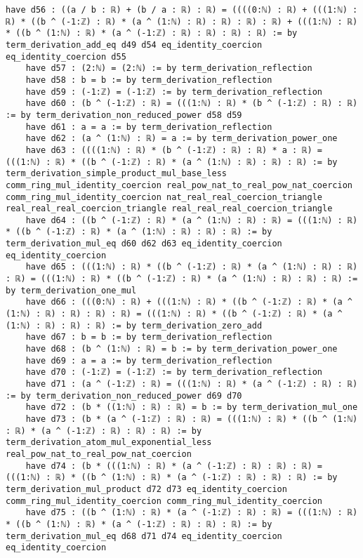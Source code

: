\documentclass{article}
\begin{document}
\begin{tcolorbox}[colback=white!10, width=\linewidth]
\begin{lstlisting}[language=Lean4]
    have d56 : ((a / b : ℝ) + (b / a : ℝ) : ℝ) = ((((0:ℕ) : ℝ) + (((1:ℕ) : ℝ) * ((b ^ (-1:ℤ) : ℝ) * (a ^ (1:ℕ) : ℝ) : ℝ) : ℝ) : ℝ) + (((1:ℕ) : ℝ) * ((b ^ (1:ℕ) : ℝ) * (a ^ (-1:ℤ) : ℝ) : ℝ) : ℝ) : ℝ) := by term_derivation_add_eq d49 d54 eq_identity_coercion eq_identity_coercion d55
    have d57 : (2:ℕ) = (2:ℕ) := by term_derivation_reflection
    have d58 : b = b := by term_derivation_reflection
    have d59 : (-1:ℤ) = (-1:ℤ) := by term_derivation_reflection
    have d60 : (b ^ (-1:ℤ) : ℝ) = (((1:ℕ) : ℝ) * (b ^ (-1:ℤ) : ℝ) : ℝ) := by term_derivation_non_reduced_power d58 d59
    have d61 : a = a := by term_derivation_reflection
    have d62 : (a ^ (1:ℕ) : ℝ) = a := by term_derivation_power_one
    have d63 : ((((1:ℕ) : ℝ) * (b ^ (-1:ℤ) : ℝ) : ℝ) * a : ℝ) = (((1:ℕ) : ℝ) * ((b ^ (-1:ℤ) : ℝ) * (a ^ (1:ℕ) : ℝ) : ℝ) : ℝ) := by term_derivation_simple_product_mul_base_less comm_ring_mul_identity_coercion real_pow_nat_to_real_pow_nat_coercion comm_ring_mul_identity_coercion nat_real_real_coercion_triangle real_real_real_coercion_triangle real_real_real_coercion_triangle
    have d64 : ((b ^ (-1:ℤ) : ℝ) * (a ^ (1:ℕ) : ℝ) : ℝ) = (((1:ℕ) : ℝ) * ((b ^ (-1:ℤ) : ℝ) * (a ^ (1:ℕ) : ℝ) : ℝ) : ℝ) := by term_derivation_mul_eq d60 d62 d63 eq_identity_coercion eq_identity_coercion
    have d65 : (((1:ℕ) : ℝ) * ((b ^ (-1:ℤ) : ℝ) * (a ^ (1:ℕ) : ℝ) : ℝ) : ℝ) = (((1:ℕ) : ℝ) * ((b ^ (-1:ℤ) : ℝ) * (a ^ (1:ℕ) : ℝ) : ℝ) : ℝ) := by term_derivation_one_mul
    have d66 : (((0:ℕ) : ℝ) + (((1:ℕ) : ℝ) * ((b ^ (-1:ℤ) : ℝ) * (a ^ (1:ℕ) : ℝ) : ℝ) : ℝ) : ℝ) = (((1:ℕ) : ℝ) * ((b ^ (-1:ℤ) : ℝ) * (a ^ (1:ℕ) : ℝ) : ℝ) : ℝ) := by term_derivation_zero_add
    have d67 : b = b := by term_derivation_reflection
    have d68 : (b ^ (1:ℕ) : ℝ) = b := by term_derivation_power_one
    have d69 : a = a := by term_derivation_reflection
    have d70 : (-1:ℤ) = (-1:ℤ) := by term_derivation_reflection
    have d71 : (a ^ (-1:ℤ) : ℝ) = (((1:ℕ) : ℝ) * (a ^ (-1:ℤ) : ℝ) : ℝ) := by term_derivation_non_reduced_power d69 d70
    have d72 : (b * ((1:ℕ) : ℝ) : ℝ) = b := by term_derivation_mul_one
    have d73 : (b * (a ^ (-1:ℤ) : ℝ) : ℝ) = (((1:ℕ) : ℝ) * ((b ^ (1:ℕ) : ℝ) * (a ^ (-1:ℤ) : ℝ) : ℝ) : ℝ) := by term_derivation_atom_mul_exponential_less real_pow_nat_to_real_pow_nat_coercion
    have d74 : (b * (((1:ℕ) : ℝ) * (a ^ (-1:ℤ) : ℝ) : ℝ) : ℝ) = (((1:ℕ) : ℝ) * ((b ^ (1:ℕ) : ℝ) * (a ^ (-1:ℤ) : ℝ) : ℝ) : ℝ) := by term_derivation_mul_product d72 d73 eq_identity_coercion comm_ring_mul_identity_coercion comm_ring_mul_identity_coercion
    have d75 : ((b ^ (1:ℕ) : ℝ) * (a ^ (-1:ℤ) : ℝ) : ℝ) = (((1:ℕ) : ℝ) * ((b ^ (1:ℕ) : ℝ) * (a ^ (-1:ℤ) : ℝ) : ℝ) : ℝ) := by term_derivation_mul_eq d68 d71 d74 eq_identity_coercion eq_identity_coercion

\end{lstlisting}
\end{tcolorbox}
\end{document}

